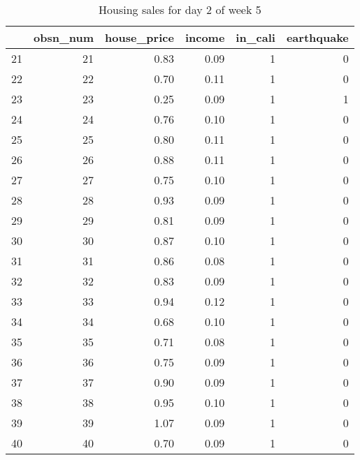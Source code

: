 \begin{table}[ht]
\centering
\begin{tabular}{rrrrrr}
  \hline
 & obsn\_num & house\_price & income & in\_cali & earthquake \\ 
  \hline
21 &  21 & 0.83 & 0.09 &   1 &   0 \\ 
  22 &  22 & 0.70 & 0.11 &   1 &   0 \\ 
  23 &  23 & 0.25 & 0.09 &   1 &   1 \\ 
  24 &  24 & 0.76 & 0.10 &   1 &   0 \\ 
  25 &  25 & 0.80 & 0.11 &   1 &   0 \\ 
  26 &  26 & 0.88 & 0.11 &   1 &   0 \\ 
  27 &  27 & 0.75 & 0.10 &   1 &   0 \\ 
  28 &  28 & 0.93 & 0.09 &   1 &   0 \\ 
  29 &  29 & 0.81 & 0.09 &   1 &   0 \\ 
  30 &  30 & 0.87 & 0.10 &   1 &   0 \\ 
  31 &  31 & 0.86 & 0.08 &   1 &   0 \\ 
  32 &  32 & 0.83 & 0.09 &   1 &   0 \\ 
  33 &  33 & 0.94 & 0.12 &   1 &   0 \\ 
  34 &  34 & 0.68 & 0.10 &   1 &   0 \\ 
  35 &  35 & 0.71 & 0.08 &   1 &   0 \\ 
  36 &  36 & 0.75 & 0.09 &   1 &   0 \\ 
  37 &  37 & 0.90 & 0.09 &   1 &   0 \\ 
  38 &  38 & 0.95 & 0.10 &   1 &   0 \\ 
  39 &  39 & 1.07 & 0.09 &   1 &   0 \\ 
  40 &  40 & 0.70 & 0.09 &   1 &   0 \\ 
   \hline
\end{tabular}
\caption{Housing sales for day 2 of week 5} 
\end{table}
